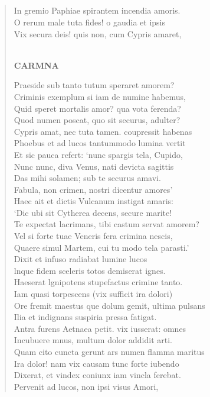 \documentclass[11pt, a4paper]{report}
\begin{document}
            \subsection*{}
      \begin{verse}
      In gremio Paphiae spirantem incendia amoris. \\ O rerum male tuta fides! o gaudia et ipsis \\ Vix secura deis! quis non, cum Cypris amaret, \\ 
        ﻿\pagebreak 
    \begin{center} \textbf{CARMNA} \end{center} \marginpar{[208]} Praeside sub tanto tutum speraret amorem? \\ Criminis exemplum si iam de numine habemus, \\ Quid speret mortalis amor? qua vota ferenda? \\ Quod numen poscat, quo sit securus, adulter? \\ Cypris amat, nec tuta tamen. coupressit habenas \\ Phoebus et ad lucos tantummodo lumina vertit \\ Et sic pauca refert: ‘nunc spargis tela, Cupido, \\ Nunc nunc, diva Venus, nati devicta sagittis \\ Das mihi solamen; sub te securus amavi. \\ Fabula, non crimen, nostri dicentur amores’ \\ Haec ait et dictis Vulcanum instigat amaris: \\ ‘Dic ubi sit Cytherea decens, secure marite! \\ Te expectat lacrimans, tibi castum servat amorem? \\ Vel si forte tuae Veneris fera crimina nescis, \\ Quaere simul Martem, cui tu modo tela parasti.’ \\ Dixit et infuso radiabat lumine lucos \\ lnque fidem sceleris totos demiserat ignes. \\ Haeserat lgnipotens stupefactus crimine tanto. \\ Iam quasi torpescens (vix sufficit ira dolori) \\ Ore fremit maestus \lbrack que \rbrack  dolum gemit, ultima pulsans \\ Ilia et indignans suspiria pressa fatigat. \\ Antra furens Aetnaea petit. vix iusserat: omnes \\ Incubuere mnus, multum dolor addidit arti. \\ Quam cito cuncta gerunt ars numen flamma maritus \\ Ira dolor! nam vix causam tunc forte iubendo \\ Dixerat, et vindex coniunx iam vincla ferebat. \\ Pervenit ad lucos, non ipsi visus Amori, \\ 

\end{verse}
\end{document}

